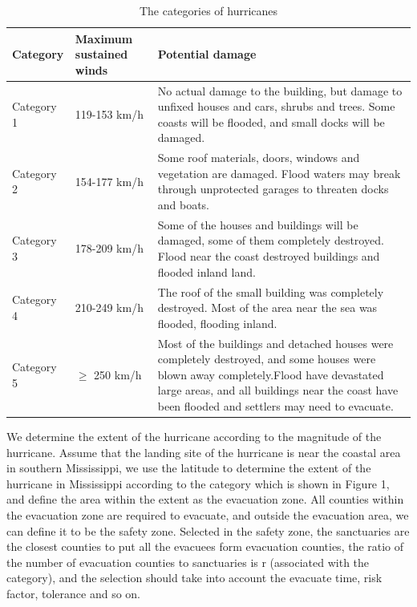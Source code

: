 \documentclass{mcmthesis}
\begin{document}
\begin{table}[!ht]
\caption{The categories of hurricanes}
 \renewcommand\arraystretch{1.5}
 \setlength{\abovecaptionskip}{0pt}%
\setlength{\belowcaptionskip}{10pt}%
\begin{center}
\begin{tabular}{p{}p{}m{}}
\toprule[1.5pt]
Category& Maximum sustained winds & Potential damage \\
 \midrule

  Category 1 & 119-153 km/h &   No actual damage to the building, but damage to unfixed houses and cars, shrubs and trees. Some coasts will be flooded, and small docks will be damaged. \\

  Category 2 & 154-177 km/h &   Some roof materials, doors, windows and vegetation are damaged. Flood waters may break through unprotected garages to threaten docks and boats. \\

  Category 3 & 178-209 km/h &   Some of the houses and buildings will be damaged, some of them completely destroyed. Flood near the coast destroyed buildings and flooded inland land. \\

  Category 4 & 210-249 km/h &   The roof of the small building was completely destroyed. Most of the area near the sea was flooded, flooding inland. \\

  Category 5 & $ \geq $ 250 km/h &   Most of the buildings and detached houses were completely destroyed, and some houses were blown away completely.Flood have devastated large areas, and all buildings near the coast have been flooded and settlers may need to evacuate. \\  \bottomrule[1.5pt]
 \end{tabular}
 \end{center} 
 \end{table}



We determine the extent of the hurricane according to the magnitude of the hurricane. Assume that the landing site of the hurricane is near the coastal area in southern Mississippi, we use the latitude to determine the extent of the hurricane in Mississippi according to the category which is shown in Figure 1, and define the area within the extent as the evacuation zone. All counties within the evacuation zone are required to evacuate, and outside the evacuation area, we can define it to be the safety zone. Selected in the safety zone, the sanctuaries are the closest counties to put all the evacuees form evacuation counties, the ratio of the number of evacuation counties to sanctuaries is r (associated with the category), and the selection should take into account the evacuate time, risk factor, tolerance and so on.
\end{document}
